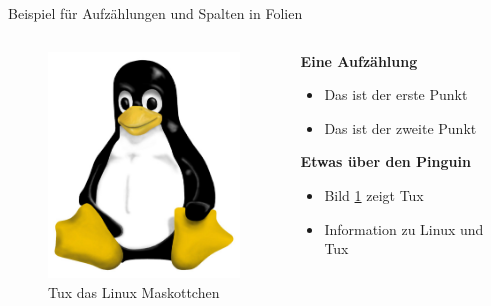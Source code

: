\documentclass[mathserif,serif,german]{beamer}
\begin{document}
\begin{frame}{Beispiel für Aufzählungen und Spalten in Folien}
	
	\begin{columns}
		
		\begin{column}{6cm}
			\flushleft
			\begin{figure}
				\centering
				\includegraphics[width=\columnwidth,height=6cm]{Figures/Pinguin}
				\caption[Pinguin]{Tux das Linux Maskottchen }
				\label{fig:Tux}
			\end{figure}
		
		\end{column}
	
		\begin{column}{6cm}
		
			\textbf{Eine Aufzählung}
			\begin{itemize}
				\item Das ist der erste Punkt
				\item Das ist der zweite Punkt
			\end{itemize}
		
			\textbf{Etwas über den Pinguin}
			\begin{itemize}
				\item Bild \ref{fig:Tux} zeigt Tux
				\item Information zu Linux und Tux \cite{Linux_Wiki,Tux_Maskottchen}
			\end{itemize}
			
		\end{column}
	
	\end{columns}	

\end{frame}
\end{document}
